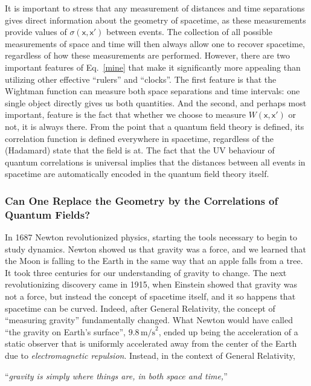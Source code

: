 \documentclass[letterpaper,12pt,titlepage,oneside,final]{book}
\newcommand{\mf}{\mathsf}%
\begin{document}
It is important to stress that any measurement of distances and time separations gives direct information about the geometry of spacetime, as these measurements provide values of $\sigma(\mf x, \mf x')$ between events. The collection of all possible measurements of space and time will then always allow one to recover spacetime, regardless of how these measurements are performed. However, there are two important features of Eq.~\eqref{mine} that make it significantly more appealing than utilizing other effective ``rulers'' and ``clocks''. The first feature is that the Wightman function can measure both space separations and time intervals: one single object directly gives us both quantities. And the second, and perhaps most important, feature is the fact that whether we choose to measure $W(\mf x, \mf x')$ or not, it is always there. From the point that a quantum field theory is defined, its correlation function is defined everywhere in spacetime, regardless of the (Hadamard) state that the field is at. The fact that the UV behaviour of quantum correlations is universal implies that the distances between all events in spacetime are automatically encoded in the quantum field theory itself.




\subsubsection*{Can One Replace the Geometry by the Correlations of Quantum Fields?}


In 1687 Newton revolutionized physics, starting the tools necessary to begin to study dynamics. Newton showed us that gravity was a force, and we learned that the Moon is falling to the Earth in the same way that an apple falls from a tree. It took three centuries for our understanding of gravity to change. The next revolutionizing discovery came in 1915, when Einstein showed that gravity was not a force, but instead the concept of spacetime itself, and it so happens that spacetime can be curved. Indeed, after General Relativity, the concept of ``measuring gravity'' fundamentally changed. What Newton would have called ``the gravity on Earth's surface'', $9.8\,\text{m/s}^2$, ended up being the acceleration of a static observer that is uniformly accelerated away from the center of the Earth due to \textit{electromagnetic repulsion}. Instead, in the context of General Relativity,

\begin{center}
    ``\textit{gravity is simply where things are, in both space and time,}''
\end{center}
\end{document}
